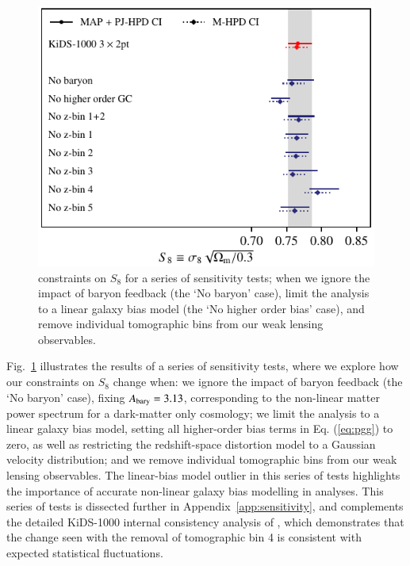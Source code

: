 \begin{figure}
	\begin{center}
		\includegraphics[width=\columnwidth]{Parameter_Plots/systematics/S8_comparison_blindC}
		\caption{\tttp constraints on $S_8$ for a series of sensitivity tests; when we ignore the impact of baryon feedback (the `No baryon' case), limit the analysis to a linear galaxy bias model (the `No higher order bias' case), and remove individual tomographic bins from our weak lensing observables.  
		\label{fig:S8comp_sensitivity}}
	\end{center}
\end{figure}

Fig.~\ref{fig:S8comp_sensitivity} illustrates the results of a series of sensitivity tests, where we explore how our \tttp constraints on $S_8$ change when: 
we ignore the impact of baryon feedback (the `No baryon' case), fixing $A_{\rm bary}=3.13$, corresponding to the non-linear matter power spectrum for a dark-matter only cosmology; 
we limit the analysis to a linear galaxy bias model, setting all higher-order bias terms in Eq. (\ref{eq:pgg}) to zero, as well as restricting the redshift-space distortion model to a Gaussian velocity distribution; 
and we remove individual tomographic bins from our weak lensing observables. 
The linear-bias model outlier in this series of tests highlights the importance of accurate non-linear galaxy bias modelling in \tttp analyses.     
This series of tests is dissected further in Appendix~\ref{app:sensitivity}, and complements the detailed KiDS-1000 internal consistency analysis of \citet{asgari/etal:inprep}, which demonstrates that the change seen with the removal of tomographic bin 4 is consistent with expected statistical fluctuations.

